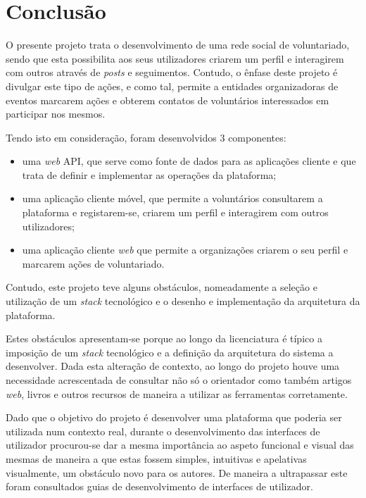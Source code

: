 \section{Conclusão}

O presente projeto trata o desenvolvimento de uma rede social de voluntariado, sendo que esta possibilita aos seus utilizadores criarem um perfil e interagirem com outros através de \textit{posts} e seguimentos. Contudo, o ênfase deste projeto é divulgar este tipo de ações, e como tal, permite a entidades organizadoras de eventos marcarem ações e obterem contatos de voluntários interessados em participar nos mesmos.

\par \medskip

Tendo isto em consideração, foram desenvolvidos 3 componentes:

\begin{itemize}
	\item uma \textit{web} API, que serve como fonte de dados para as aplicações cliente e que trata de definir e implementar as operações da plataforma;
	\item uma aplicação cliente móvel, que permite a voluntários consultarem a plataforma e registarem-se, criarem um perfil e interagirem com outros utilizadores;
	\item uma aplicação cliente \textit{web} que permite a organizações criarem o seu perfil e marcarem ações de voluntariado.
\end{itemize}

Contudo, este projeto teve alguns obstáculos, nomeadamente a seleção e utilização de um \textit{stack} tecnológico e o desenho e implementação da arquitetura da plataforma.

\par \medskip

Estes obstáculos apresentam-se porque ao longo da licenciatura é típico a imposição de um \textit{stack} tecnológico e a definição da arquitetura do sistema a desenvolver. Dada esta alteração de contexto, ao longo do projeto houve uma necessidade acrescentada de consultar não só o orientador como também artigos \textit{web}, livros e outros recursos de maneira a utilizar as ferramentas corretamente.

\par \medskip

Dado que o objetivo do projeto é desenvolver uma plataforma que poderia ser utilizada num contexto real, durante o desenvolvimento das interfaces de utilizador procurou-se dar a mesma importância ao aspeto funcional e visual das mesmas de maneira a que estas fossem simples, intuitivas e apelativas visualmente, um obstáculo novo para os autores. De maneira a ultrapassar este foram consultados guias de desenvolvimento de interfaces de utilizador.

